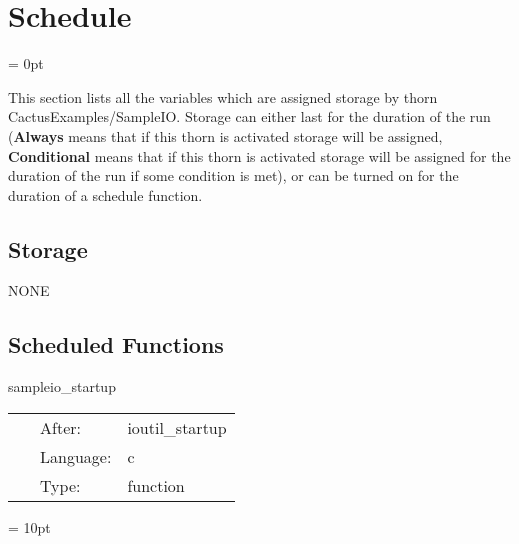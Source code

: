 
\section{Schedule} 


\parskip = 0pt


\noindent This section lists all the variables which are assigned storage by thorn CactusExamples/SampleIO.  Storage can either last for the duration of the run ({\bf Always} means that if this thorn is activated storage will be assigned, {\bf Conditional} means that if this thorn is activated storage will be assigned for the duration of the run if some condition is met), or can be turned on for the duration of a schedule function.


\subsection*{Storage}NONE
\subsection*{Scheduled Functions}
\vspace{5mm}


\hspace{5mm} sampleio\_startup 

\hspace{5mm}{\it startup routine } 


\hspace{5mm}

 \begin{tabular*}{160mm}{cll} 
~ & After:  & ioutil\_startup \\ 
~ & Language:  & c \\ 
~ & Type:  & function \\ 
\end{tabular*} 



\vspace{5mm}\parskip = 10pt 
